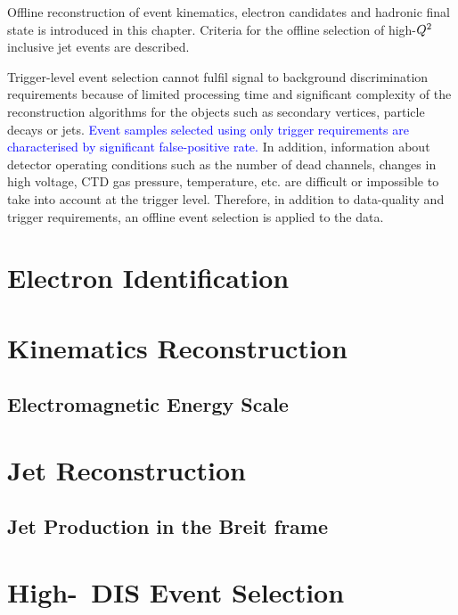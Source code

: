 Offline reconstruction of event kinematics, electron candidates and hadronic final state is introduced in this chapter. Criteria for the offline selection of high-$\mbox{${Q^2}$}$ inclusive jet events are described. 

Trigger-level event selection cannot fulfil signal to background discrimination requirements because of limited processing time and significant complexity of the reconstruction algorithms for the objects such as secondary vertices, particle decays or jets. \textcolor{blue}{Event samples selected using only trigger requirements are characterised by significant false-positive rate.} In addition, information about detector operating conditions such as the number of dead channels, changes in high voltage, CTD gas pressure, temperature, etc. are difficult or impossible to take into account at the trigger level. Therefore, in addition to data-quality and trigger requirements, an offline event selection is applied to the data.

\section{Electron Identification}
\label{sec:eleid}


\section{Kinematics Reconstruction}
\label{sec:kinrec}


\subsection{Electromagnetic Energy Scale}
\label{subsec:eleenescale}


\section{Jet Reconstruction}
\label{sec:jetreco}


\subsection{Jet Production in the Breit frame}
\label{subsec:jetsinbreit}


\section{High-\qsq\, DIS Event Selection}
\label{sec:dissel}

